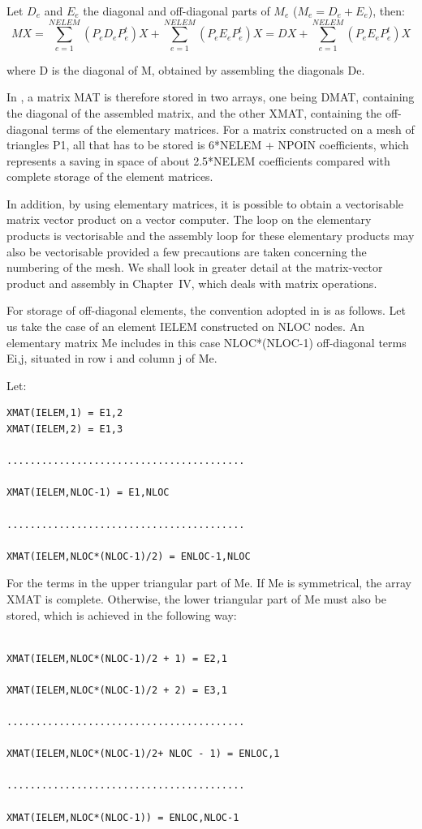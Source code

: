 Let $D_{e}$ and $E_{e}$ the diagonal and off-diagonal parts of $M_{e}$ ($M_{e}
= D_{e} + E_{e}$), then:
\[MX=\sum _{e=1}^{NELEM}(P_{e} D_{e} P_{e}^{t} )X+\sum _{e=1}^{NELEM}(P_{e}
E_{e} P_{e}^{t} )X  =DX+\sum _{e=1}^{NELEM}(P_{e} E_{e} P_{e}^{t} )X \]

where D is the diagonal of M, obtained by assembling the diagonals De.

In \bief, a matrix MAT is therefore stored in two arrays, one being DMAT,
containing the diagonal of the assembled matrix, and the other XMAT, containing
the off-diagonal terms of the elementary matrices. For a matrix constructed on
a mesh of triangles P1, all that has to be stored is 6*NELEM + NPOIN
coefficients, which represents a saving in space of about 2.5*NELEM
coefficients compared with complete storage of the element matrices.

In addition, by using elementary matrices, it is possible to obtain a
vectorisable matrix vector product on a vector computer. The loop on the
elementary products is vectorisable and the assembly loop for these elementary
products may also be vectorisable provided a few precautions are taken
concerning the numbering of the mesh. We shall look in greater detail at the
matrix-vector product and assembly in Chapter~IV, which deals with matrix
operations.

For storage of off-diagonal elements, the convention adopted in \bief is as
follows. Let us take the case of an element IELEM constructed on NLOC nodes. An
elementary matrix Me includes in this case NLOC*(NLOC-1) off-diagonal terms
Ei,j, situated in row i and column j of Me.

Let:
\begin{lstlisting}[language=TelFortran]
XMAT(IELEM,1) = E1,2
XMAT(IELEM,2) = E1,3

.........................................

XMAT(IELEM,NLOC-1) = E1,NLOC

.........................................

XMAT(IELEM,NLOC*(NLOC-1)/2) = ENLOC-1,NLOC
\end{lstlisting}

For the terms in the upper triangular part of Me. If Me is symmetrical, the
array XMAT is complete. Otherwise, the lower triangular part of Me must also be
stored, which is achieved in the following way:
\begin{lstlisting}[language=TelFortran]

XMAT(IELEM,NLOC*(NLOC-1)/2 + 1) = E2,1

XMAT(IELEM,NLOC*(NLOC-1)/2 + 2) = E3,1

.........................................

XMAT(IELEM,NLOC*(NLOC-1)/2+ NLOC - 1) = ENLOC,1

.........................................

XMAT(IELEM,NLOC*(NLOC-1)) = ENLOC,NLOC-1
\end{lstlisting}

